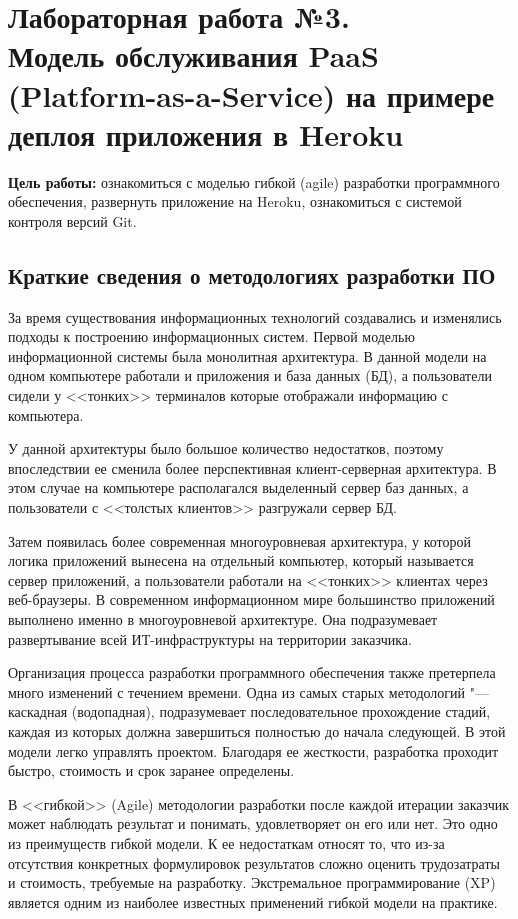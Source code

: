 \section[Лабораторная работа №3]{Лабораторная работа №3. \\
Модель обслуживания PaaS (Platform-as-a-Service) на примере деплоя приложения в Heroku}

\textbf{Цель работы:} ознакомиться с моделью гибкой (agile) разработки программного обеспечения, развернуть приложение на Heroku, ознакомиться с системой контроля версий Git.

\subsection{Краткие сведения о методологиях разработки ПО}
За время существования информационных технологий создавались и изменялись подходы к построению информационных систем.
Первой моделью информационной системы была монолитная архитектура.
В данной модели на одном компьютере работали и приложения и база данных (БД), а пользователи сидели у <<тонких>> терминалов которые отображали информацию с компьютера.

У данной архитектуры было большое количество недостатков, поэтому впоследствии ее сменила более перспективная клиент-серверная архитектура.
В этом случае на компьютере располагался выделенный сервер баз данных, а пользователи с <<толстых клиентов>> разгружали сервер БД.

Затем появилась более современная многоуровневая архитектура, у которой логика приложений вынесена на отдельный компьютер, который называется сервер приложений, а пользователи работали на <<тонких>> клиентах через веб-браузеры.
В современном информационном мире большинство приложений выполнено именно в многоуровневой архитектуре.
Она подразумевает развертывание всей ИТ-инфраструктуры на территории заказчика.

Организация процесса разработки программного обеспечения также претерпела много изменений с течением времени.
Одна из самых старых методологий "--- каскадная (водопадная), подразумевает последовательное прохождение стадий, каждая из которых должна завершиться полностью до начала следующей.
В этой модели легко управлять проектом.
Благодаря ее жесткости, разработка проходит быстро, стоимость и срок заранее определены.

В <<гибкой>> (Agile) методологии разработки после каждой итерации заказчик может наблюдать результат и понимать, удовлетворяет он его или нет.
Это одно из преимуществ гибкой модели.
К ее недостаткам относят то, что из-за отсутствия конкретных формулировок результатов сложно оценить трудозатраты и стоимость, требуемые на разработку.
Экстремальное программирование (XP) является одним из наиболее известных применений гибкой модели на практике.

